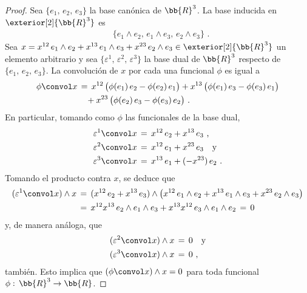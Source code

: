 \begin{proof}
	Sea $\{e_{1},\,e_{2},\,e_{3}\}$ la base can\'{o}nica de
	$\bb{R}^{3}$. La base inducida en $\exterior[2]{\bb{R}^{3}}$ es
	\begin{align*}
		 & \{e_{1}\wedge e_{2},
		 	\,e_{1}\wedge e_{3},\,e_{2}\wedge e_{3}\}
		\text{ .}
	\end{align*}
	Sea $x=x^{12}\,e_{1}\wedge e_{2}+x^{13}\,e_{1}\wedge e_{3}+%
	x^{23}\,e_{2}\wedge e_{3}\in\exterior[2]{\bb{R}^{3}}$ un
	elemento arbitrario y sea
	$\{\varepsilon^{1},\,\varepsilon^{2},\,\varepsilon^{3}\}$ la base
	dual de $\bb{R}^{3}$ respecto de $\{e_{1},\,e_{2},\,e_{3}\}$.
	La convoluci\'{o}n de $x$ por cada una funcional $\phi$ es igual a
	\begin{align*}
		\phi\convol x & \,=\,
			x^{12}\,\big(\phi(e_{1})\,e_{2}-\phi(e_{2})\,e_{1}\big)
			+
			x^{13}\,\big(\phi(e_{1})\,e_{3}-\phi(e_{3})\,e_{1}\big)
			\\
		& \quad +
			x^{23}\,\big(\phi(e_{2})\,e_{3}-\phi(e_{3})\,e_{2}\big)
		\text{ .}
	\end{align*}
	En particular, tomando como $\phi$ las funcionales de la base dual,
	\begin{align*}
		\varepsilon^{1}\convol x & \,=\,x^{12}\,e_{2}+x^{13}\,e_{3}
		\text{ ,} \\
		\varepsilon^{2}\convol x & \,=\,x^{12}\,e_{1}+x^{23}\,e_{3}
		\quad\text{y} \\
		\varepsilon^{3}\convol x & \,=\,x^{13}\,e_{1}+(-x^{23})\,e_{2}
		\text{ .}
	\end{align*}
	Tomando el producto contra $x$, se deduce que
	\begin{align*}
		(\varepsilon^{1}\convol x)\wedge x & \,=\,
			(x^{12}\,e_{2}+x^{13}\,e_{3})\wedge
			\big(x^{12}\,e_{1}\wedge e_{2}+
			x^{13}\,e_{1}\wedge e_{3}+
			x^{23}\,e_{2}\wedge e_{3}\big) \\
		& \,=\,x^{12}x^{13}\,e_{2}\wedge e_{1}\wedge e_{3}+
			x^{13}x^{12}\,e_{3}\wedge e_{1}\wedge e_{2}
			\,=\,0
	\end{align*}
	y, de manera an\'{a}loga, que
	\begin{align*}
		(\varepsilon^{2}\convol x)\wedge x & \,=\,0
		\quad\text{y} \\
		(\varepsilon^{3}\convol x)\wedge x & \,=\,0
		\text{ ,}
	\end{align*}
	tambi\'{e}n. Esto implica que $(\phi\convol x)\wedge x=0$
	para toda funcional $\phi:\,\bb{R}^{3}\rightarrow\bb{R}$.


\end{proof}
